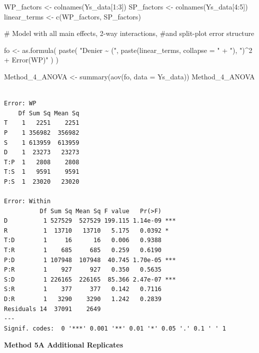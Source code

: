 \documentclass[
  letterpaper,
  DIV=11,
  numbers=noendperiod]{scrartcl}
\newenvironment{Shaded}{\begin{snugshade}}{\end{snugshade}}
\newcommand{\AttributeTok}[1]{\textcolor[rgb]{0.40,0.45,0.13}{#1}}
\newcommand{\CommentTok}[1]{\textcolor[rgb]{0.37,0.37,0.37}{#1}}
\newcommand{\DecValTok}[1]{\textcolor[rgb]{0.68,0.00,0.00}{#1}}
\newcommand{\FunctionTok}[1]{\textcolor[rgb]{0.28,0.35,0.67}{#1}}
\newcommand{\NormalTok}[1]{\textcolor[rgb]{0.00,0.23,0.31}{#1}}
\newcommand{\OtherTok}[1]{\textcolor[rgb]{0.00,0.23,0.31}{#1}}
\newcommand{\SpecialCharTok}[1]{\textcolor[rgb]{0.37,0.37,0.37}{#1}}
\newcommand{\StringTok}[1]{\textcolor[rgb]{0.13,0.47,0.30}{#1}}
\begin{document}
\begin{Shaded}
\begin{Highlighting}[]
\NormalTok{WP\_factors }\OtherTok{\textless{}{-}} \FunctionTok{colnames}\NormalTok{(Ys\_data[}\DecValTok{1}\SpecialCharTok{:}\DecValTok{3}\NormalTok{])}
\NormalTok{SP\_factors }\OtherTok{\textless{}{-}} \FunctionTok{colnames}\NormalTok{(Ys\_data[}\DecValTok{4}\SpecialCharTok{:}\DecValTok{5}\NormalTok{])}
\NormalTok{linear\_terms }\OtherTok{\textless{}{-}} \FunctionTok{c}\NormalTok{(WP\_factors, SP\_factors)}

\CommentTok{\# Model with all main effects, 2{-}way interactions,}
\CommentTok{\#and split{-}plot error structure}

\NormalTok{fo }\OtherTok{\textless{}{-}} \FunctionTok{as.formula}\NormalTok{(}
  \FunctionTok{paste}\NormalTok{(}
    \StringTok{"Denier \textasciitilde{} ("}\NormalTok{, }
    \FunctionTok{paste}\NormalTok{(linear\_terms, }\AttributeTok{collapse =} \StringTok{" + "}\NormalTok{), }
    \StringTok{")\^{}2 + Error(WP)"}
\NormalTok{  )}
\NormalTok{)}

\NormalTok{Method\_4\_ANOVA }\OtherTok{\textless{}{-}} \FunctionTok{summary}\NormalTok{(}\FunctionTok{aov}\NormalTok{(fo, }\AttributeTok{data =}\NormalTok{ Ys\_data))}
\NormalTok{Method\_4\_ANOVA}
\end{Highlighting}
\end{Shaded}

\begin{verbatim}

Error: WP
    Df Sum Sq Mean Sq
T    1   2251    2251
P    1 356982  356982
S    1 613959  613959
D    1  23273   23273
T:P  1   2808    2808
T:S  1   9591    9591
P:S  1  23020   23020

Error: Within
          Df Sum Sq Mean Sq F value   Pr(>F)    
D          1 527529  527529 199.115 1.14e-09 ***
R          1  13710   13710   5.175   0.0392 *  
T:D        1     16      16   0.006   0.9388    
T:R        1    685     685   0.259   0.6190    
P:D        1 107948  107948  40.745 1.70e-05 ***
P:R        1    927     927   0.350   0.5635    
S:D        1 226165  226165  85.366 2.47e-07 ***
S:R        1    377     377   0.142   0.7116    
D:R        1   3290    3290   1.242   0.2839    
Residuals 14  37091    2649                     
---
Signif. codes:  0 '***' 0.001 '**' 0.01 '*' 0.05 '.' 0.1 ' ' 1
\end{verbatim}

\textbf{Method 5A Additional Replicates}
\end{document}

